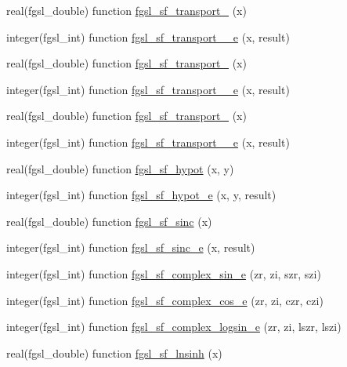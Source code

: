 \begin{DoxyCompactItemize}
\item 
real(fgsl\-\_\-double) function \hyperlink{specfunc_8finc_a666e431990a5c84ba04a9986e8cc83e7}{fgsl\-\_\-sf\-\_\-transport\-\_} (x)
\item 
integer(fgsl\-\_\-int) function \hyperlink{specfunc_8finc_acbe93f73e5f115885c4ea244d1e2e02e}{fgsl\-\_\-sf\-\_\-transport\-\_\-\_\-e} (x, result)
\item 
real(fgsl\-\_\-double) function \hyperlink{specfunc_8finc_a938e89b7c0e98f4bd33f5121ce7b3d85}{fgsl\-\_\-sf\-\_\-transport\-\_} (x)
\item 
integer(fgsl\-\_\-int) function \hyperlink{specfunc_8finc_aab758066583d4c24bce57899092b6897}{fgsl\-\_\-sf\-\_\-transport\-\_\-\_\-e} (x, result)
\item 
real(fgsl\-\_\-double) function \hyperlink{specfunc_8finc_a8e68293fb93439d28464bb8c412301c5}{fgsl\-\_\-sf\-\_\-transport\-\_} (x)
\item 
integer(fgsl\-\_\-int) function \hyperlink{specfunc_8finc_ae2471dfc998320a633b03dd217ee4a4a}{fgsl\-\_\-sf\-\_\-transport\-\_\-\_\-e} (x, result)
\item 
real(fgsl\-\_\-double) function \hyperlink{specfunc_8finc_a0cb9cfebcedb5a689ad9bb56d410e829}{fgsl\-\_\-sf\-\_\-hypot} (x, y)
\item 
integer(fgsl\-\_\-int) function \hyperlink{specfunc_8finc_ade7cfa1350a14a8cf5435bd603a12cb0}{fgsl\-\_\-sf\-\_\-hypot\-\_\-e} (x, y, result)
\item 
real(fgsl\-\_\-double) function \hyperlink{specfunc_8finc_a5de6b8dace55d850a032754ef7c970f8}{fgsl\-\_\-sf\-\_\-sinc} (x)
\item 
integer(fgsl\-\_\-int) function \hyperlink{specfunc_8finc_a06fe56f01f7a54748213d698086b7c79}{fgsl\-\_\-sf\-\_\-sinc\-\_\-e} (x, result)
\item 
integer(fgsl\-\_\-int) function \hyperlink{specfunc_8finc_a796e7d0e3c831db7c7d4ec07aa6adee9}{fgsl\-\_\-sf\-\_\-complex\-\_\-sin\-\_\-e} (zr, zi, szr, szi)
\item 
integer(fgsl\-\_\-int) function \hyperlink{specfunc_8finc_a268d1473862e7d9ff7d46cf86b298db9}{fgsl\-\_\-sf\-\_\-complex\-\_\-cos\-\_\-e} (zr, zi, czr, czi)
\item 
integer(fgsl\-\_\-int) function \hyperlink{specfunc_8finc_acc1ca8d3cd2cadd0970408ffd4028569}{fgsl\-\_\-sf\-\_\-complex\-\_\-logsin\-\_\-e} (zr, zi, lszr, lszi)
\item 
real(fgsl\-\_\-double) function \hyperlink{specfunc_8finc_a4a161e72b8946f3d4745d5a2a00c4118}{fgsl\-\_\-sf\-\_\-lnsinh} (x)

\end{DoxyCompactItemize}
